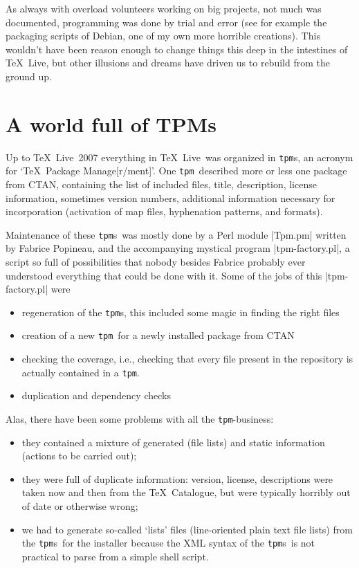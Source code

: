 \documentclass{arstexnica}
\newcommand{\tl}{\TeX~Live}
\newcommand{\ctan}{CTAN}
\newcommand{\tpm}{\texttt{tpm}}
\newcommand{\tpms}{\tpm{}s}
\begin{document}
\begin{article}
As always with overload volunteers working on big projects, not much
was documented, programming was done by trial and error (see for
example the packaging scripts of Debian, one of my own more horrible
creations). This wouldn't have been reason enough to change things
this deep in the intestines of \tl, but other illusions and dreams
have driven us to rebuild from the ground up.

\section{A world full of TPMs}
\label{sec:tpm}

Up to \tl~2007 everything in \tl\ was organized in \tpms, an
acronym for `\TeX\ Package Manage[r/ment]'. One \tpm\ described more
or less one package from \ctan, containing the list of included
files, title, description, license information, sometimes version
numbers, additional information necessary for incorporation
(activation of map files, hyphenation patterns, and formats).

Maintenance of these \tpms\ was mostly done by a Perl module |Tpm.pm|
written by Fabrice Popineau, and the accompanying mystical program
|tpm-factory.pl|, a script so full of possibilities that nobody
besides Fabrice probably ever understood everything that could be done with
it. Some of the jobs of this |tpm-factory.pl| were
\begin{itemize}
\item regeneration of the \tpms, this included some magic in finding
  the right files
\item creation of a new \tpm\ for a newly installed package from \ctan
\item checking the coverage, i.e., checking that every file present in
  the repository is actually contained in a \tpm.
\item duplication and dependency checks
\end{itemize}

Alas, there have been some problems with all the \tpm-business:
\begin{itemize}
\item they contained a mixture of generated (file lists) and static
  information (actions to be carried out);
\item they were full of duplicate information: version, license,
  descriptions were taken now and then from the \TeX\ Catalogue, but
  were typically horribly out of date or otherwise wrong;
\item we had to generate so-called `lists' files (line-oriented plain
  text file lists) from the \tpms\ for the installer
  because the XML syntax of the \tpms\ is not practical to parse from a simple
  shell script.
\end{itemize}


\end{article}
\end{document}
